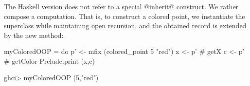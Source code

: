 \noindent
The Haskell version does not refer to a special @inherit@
construct. We rather compose a computation. That is, to construct a
colored point, we instantiate the superclass while maintaining open
recursion, and the obtained record is extended by the new method:


\begin{code}
 myColoredOOP =
   do
      p' <- mfix (colored_point 5 "red")
      x  <- p' # getX
      c  <- p' # getColor
      Prelude.print (x,c)
\end{code}

\begin{code}
 ghci>  myColoredOOP
 (5,"red")
\end{code}

